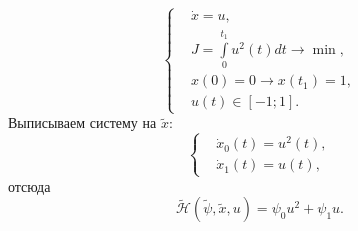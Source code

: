 \begin{example}
    $$
        \left\{
            \begin{aligned}
                & \dot{x} = u, \\
                & J = \int\limits_{0}^{t_1} u^2(t) dt \to \min, \\
                & x(0) = 0 \to x(t_1) = 1, \\
                & u(t) \in [-1; 1].
            \end{aligned}
        \right.
    $$
    Выписываем систему на $\tilde{x}$:
    $$
        \left\{
            \begin{aligned}
                & \dot{x}_0(t) = u^2(t), \\
                & \dot{x}_1(t) = u(t),
            \end{aligned}
        \right.
    $$
    отсюда
    $$
        \tilde{\mathscr{H}}(\tilde{\psi}, \tilde{x}, u) = \psi_0 u^2 + \psi_1 u.
    $$


\end{example}
